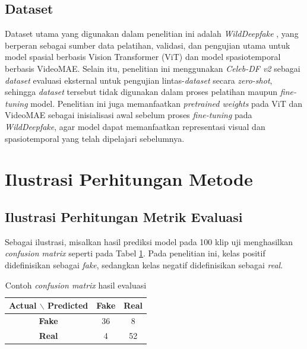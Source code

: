\subsection{Dataset} \label{III.Dataset}
Dataset utama yang digunakan dalam penelitian ini adalah \textit{WildDeepfake} \cite{Zi2024}\cite{wilddeepfake_hf}, yang berperan sebagai sumber data pelatihan, validasi, dan pengujian utama untuk model spasial berbasis Vision Transformer (ViT) dan model spasiotemporal berbasis VideoMAE. Selain itu, penelitian ini menggunakan \textit{Celeb-DF v2} \cite{li2020celebdflargescalechallengingdataset}\cite{celebdfv2_kaggle} sebagai \textit{dataset} evaluasi eksternal untuk pengujian lintas-\textit{dataset} secara \textit{zero-shot}, sehingga \textit{dataset} tersebut tidak digunakan dalam proses pelatihan maupun \textit{fine-tuning} model. Penelitian ini juga memanfaatkan \textit{pretrained weights} pada ViT dan VideoMAE sebagai inisialisasi awal sebelum proses \textit{fine-tuning} pada \textit{WildDeepfake}, agar model dapat memanfaatkan representasi visual dan spasiotemporal yang telah dipelajari sebelumnya. \par

\section{Ilustrasi Perhitungan Metode} \label{III.Ilustrasi}

\subsection{Ilustrasi Perhitungan Metrik Evaluasi}
Sebagai ilustrasi, misalkan hasil prediksi model pada 100 klip uji menghasilkan \textit{confusion matrix} seperti pada Tabel \ref{tab:3.contoh-confusion-matrix}. Pada penelitian ini, kelas positif didefinisikan sebagai \textit{fake}, sedangkan kelas negatif didefinisikan sebagai \textit{real}. \par

\begin{table}[H]
	\centering
	\caption{Contoh \textit{confusion matrix} hasil evaluasi}
	\label{tab:3.contoh-confusion-matrix}
	\begin{tabular}{|c|c|c|}
		\hline
		\textbf{Actual $\backslash$ Predicted} & \textbf{Fake} & \textbf{Real} \\
		\hline
		\textbf{Fake} & 36 & 8 \\
		\hline
		\textbf{Real} & 4 & 52 \\
		\hline
	\end{tabular}
\end{table}
\par

